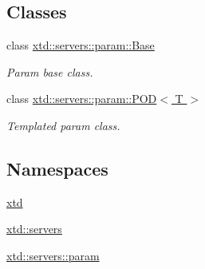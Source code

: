 \subsection*{Classes}
\begin{DoxyCompactItemize}
\item 
class \hyperlink{classxtd_1_1servers_1_1param_1_1Base}{xtd\+::servers\+::param\+::\+Base}
\begin{DoxyCompactList}\small\item\em Param base class. \end{DoxyCompactList}\item 
class \hyperlink{classxtd_1_1servers_1_1param_1_1POD}{xtd\+::servers\+::param\+::\+P\+O\+D$<$ T $>$}
\begin{DoxyCompactList}\small\item\em Templated param class. \end{DoxyCompactList}\end{DoxyCompactItemize}
\subsection*{Namespaces}
\begin{DoxyCompactItemize}
\item 
 \hyperlink{namespacextd}{xtd}
\item 
 \hyperlink{namespacextd_1_1servers}{xtd\+::servers}
\item 
 \hyperlink{namespacextd_1_1servers_1_1param}{xtd\+::servers\+::param}
\end{DoxyCompactItemize}
